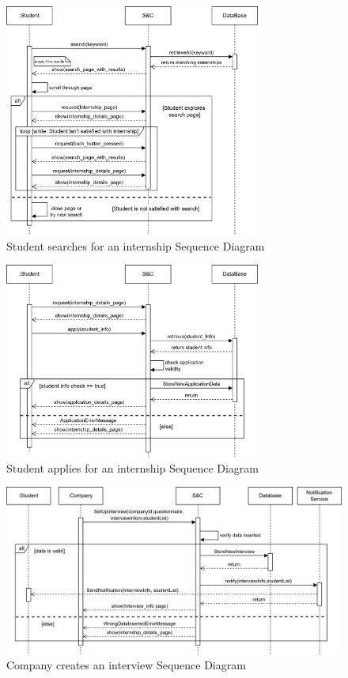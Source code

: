 \begin{figure}[H]
    \centering
    \includegraphics[width=0.75\textwidth]{Images/Sequence_Diagrams/searchInt_SD.png}
    \caption{Student searches for an internship Sequence Diagram}
\end{figure}
\begin{figure}[H]
    \centering
    \includegraphics[width=0.75\textwidth]{Images/Sequence_Diagrams/applyInt_SD.png}
    \caption{Student applies for an internship Sequence Diagram}
\end{figure}
\begin{figure}[H]
    \centering
    \includegraphics[width=1.05\textwidth]{Images/Sequence_Diagrams/createIntvw_SD.png}
    \caption{Company creates an interview Sequence Diagram}
\end{figure}
